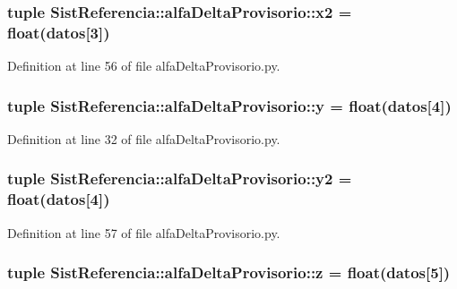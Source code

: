 \subsubsection[{x2}]{\setlength{\rightskip}{0pt plus 5cm}tuple {\bf \-Sist\-Referencia\-::alfa\-Delta\-Provisorio\-::x2} = float({\bf datos}[3])}\label{namespace_sist_referencia_1_1alfa_delta_provisorio_a12c31dad2ad4a1009347bd49b6e4a42c}


\-Definition at line 56 of file alfa\-Delta\-Provisorio.\-py.

\subsubsection[{y}]{\setlength{\rightskip}{0pt plus 5cm}tuple {\bf \-Sist\-Referencia\-::alfa\-Delta\-Provisorio\-::y} = float({\bf datos}[4])}\label{namespace_sist_referencia_1_1alfa_delta_provisorio_a9f96e6c194746e4d886acb714d0ebd4c}


\-Definition at line 32 of file alfa\-Delta\-Provisorio.\-py.

\subsubsection[{y2}]{\setlength{\rightskip}{0pt plus 5cm}tuple {\bf \-Sist\-Referencia\-::alfa\-Delta\-Provisorio\-::y2} = float({\bf datos}[4])}\label{namespace_sist_referencia_1_1alfa_delta_provisorio_adfde173e244c1a6083de85a1cc725863}


\-Definition at line 57 of file alfa\-Delta\-Provisorio.\-py.

\subsubsection[{z}]{\setlength{\rightskip}{0pt plus 5cm}tuple {\bf \-Sist\-Referencia\-::alfa\-Delta\-Provisorio\-::z} = float({\bf datos}[5])}\label{namespace_sist_referencia_1_1alfa_delta_provisorio_a10f724a1d7d5a689a4460dd88719ff7e}


